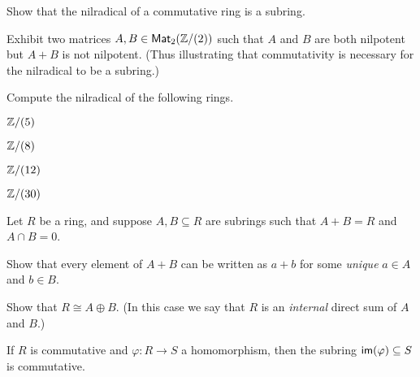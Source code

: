 \begin{exercise}
Show that the nilradical of a commutative ring is a subring.
\end{exercise}

\begin{exercise}
Exhibit two matrices \(A, B \in \mathsf{Mat}_{2}(\mathbb{Z}/(2))\) such that \(A\) and \(B\) are both nilpotent but \(A + B\) is not nilpotent.
(Thus illustrating that commutativity is necessary for the nilradical to be a subring.)
\end{exercise}

\begin{exercise}
Compute the nilradical of the following rings.
\begin{proplist*}
\item \(\mathbb{Z}/(5)\)
\item \(\mathbb{Z}/(8)\)
\item \(\mathbb{Z}/(12)\)
\item \(\mathbb{Z}/(30)\)
\end{proplist*}
\end{exercise}

\begin{exercise}
Let \(R\) be a ring, and suppose \(A,B \subseteq R\) are subrings such that \(A + B = R\) and \(A \cap B = 0\).
\begin{proplist}
\item Show that every element of \(A + B\) can be written as \(a + b\) for some \emph{unique} \(a \in A\) and \(b \in B\).
\item Show that \(R \cong A \oplus B\).
(In this case we say that \(R\) is an \emph{internal} direct sum of \(A\) and \(B\).)
\end{proplist}
\end{exercise}

\begin{exercise}
If \(R\) is commutative and \(\varphi : R \rightarrow S\) a homomorphism, then the subring \( \mathsf{im}(\varphi)  \subseteq S\) is commutative.
\end{exercise}

